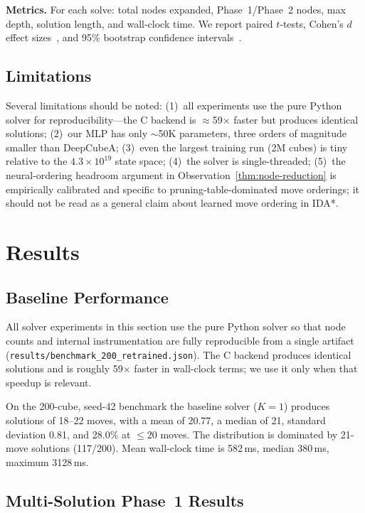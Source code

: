 \documentclass[graybox]{svmult}
\begin{document}
\textbf{Metrics.} For each solve: total nodes expanded, Phase~1/Phase~2 nodes, max depth, solution length, and wall-clock time. We report paired $t$-tests, Cohen's $d$ effect sizes~\cite{cohen1988}, and 95\% bootstrap confidence intervals~\cite{efron1993}.

\subsection{Limitations}
Several limitations should be noted: (1)~all experiments use the pure Python solver for reproducibility---the C backend is $\approx$59$\times$ faster but produces identical solutions; (2)~our MLP has only $\sim$50K parameters, three orders of magnitude smaller than DeepCubeA; (3)~even the largest training run (2M cubes) is tiny relative to the $4.3 \times 10^{19}$ state space; (4)~the solver is single-threaded; (5)~the neural-ordering headroom argument in Observation~\ref{thm:node-reduction} is empirically calibrated and specific to pruning-table-dominated move orderings; it should not be read as a general claim about learned move ordering in IDA*.

\section{Results}
\label{sec:results}

\subsection{Baseline Performance}
\label{sec:baseline}

All solver experiments in this section use the pure Python solver so that node counts and internal instrumentation are fully reproducible from a single artifact (\texttt{results/benchmark\_200\_retrained.json}). The C backend produces identical solutions and is roughly 59$\times$ faster in wall-clock terms; we use it only when that speedup is relevant.

On the 200-cube, seed-42 benchmark the baseline solver ($K{=}1$) produces solutions of 18--22 moves, with a mean of 20.77, a median of 21, standard deviation 0.81, and 28.0\% at $\leq$20 moves. The distribution is dominated by 21-move solutions (117/200). Mean wall-clock time is 582\,ms, median 380\,ms, maximum 3128\,ms.

\subsection{Multi-Solution Phase~1 Results}
\label{sec:multi-results}
\end{document}
